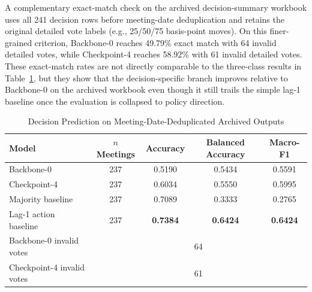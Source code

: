A complementary exact-match check on the archived decision-summary workbook uses all 241 decision rows before meeting-date deduplication and retains the original detailed vote labels (e.g., 25/50/75 basis-point moves). On this finer-grained criterion, Backbone-0 reaches 49.79\% exact match with 64 invalid detailed votes, while Checkpoint-4 reaches 58.92\% with 61 invalid detailed votes. These exact-match rates are not directly comparable to the three-class results in Table~\ref{tab:ch2:decision_acc}, but they show that the decision-specific branch improves relative to Backbone-0 on the archived workbook even though it still trails the simple lag-1 baseline once the evaluation is collapsed to policy direction.

\begin{table}[htbp]
    \centering
    \footnotesize
    \begin{tabular}{l c c c c}
        \toprule
        \textbf{Model} & \textbf{$n$ Meetings} & \textbf{Accuracy} & \textbf{Balanced Accuracy} & \textbf{Macro-F1} \\
        \midrule
        Backbone-0 & 237 & 0.5190 & 0.5434 & 0.5591 \\
        Checkpoint-4 & 237 & 0.6034 & 0.5550 & 0.5995 \\
        Majority baseline & 237 & 0.7089 & 0.3333 & 0.2765 \\
        Lag-1 action baseline & 237 & \textbf{0.7384} & \textbf{0.6424} & \textbf{0.6424} \\
        \midrule
        Backbone-0 invalid votes & \multicolumn{4}{c}{64} \\
        Checkpoint-4 invalid votes & \multicolumn{4}{c}{61} \\
        \bottomrule
    \end{tabular}
    \caption{Decision Prediction on Meeting-Date-Deduplicated Archived Outputs}
    \label{tab:ch2:decision_acc}
\end{table}


